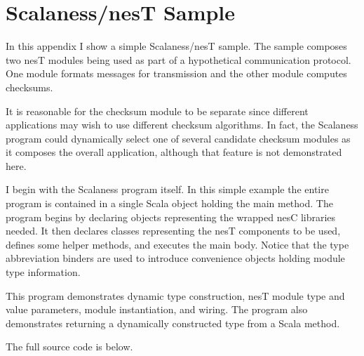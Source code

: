 
\chapter{Scalaness/nesT Sample}
\label{chapter-sample}


In this appendix I show a simple Scalaness/nesT sample. The sample composes two nesT modules
being used as part of a hypothetical communication protocol. One module formats messages for
transmission and the other module computes checksums.

It is reasonable for the checksum module to be separate since different applications may wish to
use different checksum algorithms. In fact, the Scalaness program could dynamically select one
of several candidate checksum modules as it composes the overall application, although that
feature is not demonstrated here.

I begin with the Scalaness program itself. In this simple example the entire program is
contained in a single Scala object holding the main method. The program begins by declaring
objects representing the wrapped nesC libraries needed. It then declares classes representing
the nesT components to be used, defines some helper methods, and executes the main body. Notice
that the type abbreviation binders \cite{watson-masters-2013} are used to introduce convenience
objects holding module type information.

This program demonstrates dynamic type construction, nesT module type and value parameters,
module instantiation, and wiring. The program also demonstrates returning a dynamically
constructed type from a Scala method.

The full source code is below.


